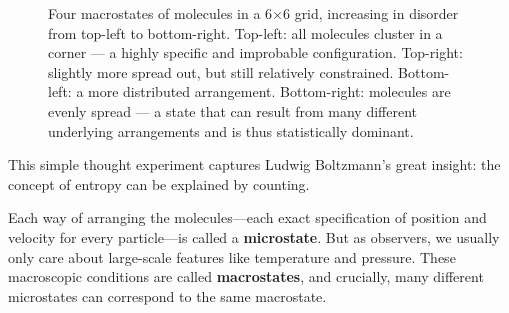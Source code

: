 \begin{figure}[H]
\centering
{}
\caption{
Four macrostates of molecules in a 6×6 grid, increasing in disorder from top-left to bottom-right. 
Top-left: all molecules cluster in a corner — a highly specific and improbable configuration. 
Top-right: slightly more spread out, but still relatively constrained. 
Bottom-left: a more distributed arrangement. 
Bottom-right: molecules are evenly spread — a state that can result from many different underlying arrangements and is thus statistically dominant.
}
\end{figure}






This simple thought experiment captures Ludwig Boltzmann’s great insight: the concept of entropy can be explained by counting.

Each way of arranging the molecules—each exact specification of position and velocity for every particle—is called a \textbf{microstate}. But as observers, we usually only care about large-scale features like temperature and pressure. These macroscopic conditions are called \textbf{macrostates}, and crucially, many different microstates can correspond to the same macrostate.

